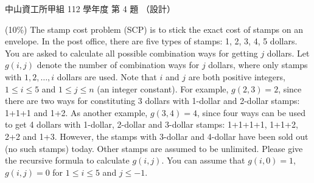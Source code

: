 \begin{pastexam}[label={px:nsysu-112-osds-04}]{中山資工所甲組 112 學年度 第 4 題}
（設計）

(10\%) The stamp cost problem (SCP) is to stick the exact cost of stamps on an envelope. In the post
office, there are five types of stamps: 1, 2, 3, 4, 5 dollars. You are asked to calculate all possible
combination ways for getting $j$ dollars. Let $g(i,j)$ denote the number of combination ways for $j$
dollars, where only stamps with $1, 2, \ldots, i$ dollars are used. Note that $i$ and $j$ are both positive
integers, $1\le i\le 5$ and $1\le j\le n$ (an integer constant). For example, $g(2,3)=2$, since there are
two ways for constituting 3 dollars with 1-dollar and 2-dollar stamps: 1+1+1 and 1+2. As another example,
$g(3,4)=4$, since four ways can be used to get 4 dollars with 1-dollar, 2-dollar and 3-dollar stamps:
1+1+1+1, 1+1+2, 2+2 and 1+3. However, the stamps with 3-dollar and 4-dollar have been sold out (no such
stamps) today. Other stamps are assumed to be unlimited. Please give the recursive formula to calculate
$g(i,j)$. You can assume that $g(i,0)=1$, $g(i,j)=0$ for $1\le i\le 5$ and $j\le -1$.
\end{pastexam}

